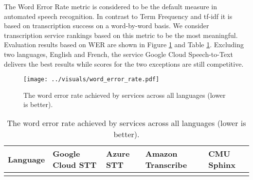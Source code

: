 \documentclass[11pt]{article}
\begin{document}
The Word Error Rate metric is considered to be the default measure in automated speech recognition. 
In contrast to Term Frequency and tf-idf it is based on transcription success on a word-by-word basis.
We consider transcription service rankings based on this metric to be the most meaningful.
Evaluation results based on WER are shown in Figure \ref{fig:word_error_rate} and Table \ref{tbl:word_error_rate}.
Excluding two languages, English and French, the service Google Cloud Speech-to-Text delivers the best results while scores for the two exceptions are still competitive. \\
\begin{figure}[!ht]
	\centering
	\texttt{[image: ../visuals/word\_error\_rate.pdf]}
	\vspace{-7mm}
	\caption{The word error rate achieved by services across all languages (lower is better).}
	\label{fig:word_error_rate}
\end{figure}
\begin{table}[!ht]
	\centering
	\begin{tabular}{l>{\Centering}m{20mm}>{\Centering}m{20mm}>{\Centering}m{20mm}>{\Centering}m{20mm}}
		\toprule
		Language & Google Cloud STT & Azure STT & Amazon Transcribe & CMU Sphinx \\
		\midrule
		\werTbl
		\bottomrule
	\end{tabular}
	\caption{The word error rate achieved by services across all languages (lower is better).}
  \label{tbl:word_error_rate}
\end{table}
\end{document}
